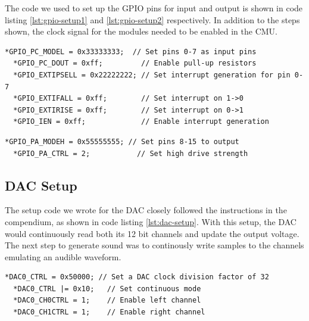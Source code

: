 The code we used to set up the GPIO pins for input and output is shown in code listing \ref{lst:gpio-setup1} and \ref{lst:gpio-setup2} respectively. In addition to the steps shown, the clock signal for the modules needed to be enabled in the CMU. \\

\noindent\begin{minipage}[pos=c,contentpos=c]{\textwidth}
  \begin{lstlisting}[caption=Setting GPIO pins 0-7 as input,label={lst:gpio-setup1}]
  *GPIO_PC_MODEL = 0x33333333;  // Set pins 0-7 as input pins
  *GPIO_PC_DOUT = 0xff;         // Enable pull-up resistors
  *GPIO_EXTIPSELL = 0x22222222; // Set interrupt generation for pin 0-7
  *GPIO_EXTIFALL = 0xff;        // Set interrupt on 1->0
  *GPIO_EXTIRISE = 0xff;        // Set interrupt on 0->1
  *GPIO_IEN = 0xff;             // Enable interrupt generation
  \end{lstlisting}
\end{minipage}

\noindent\begin{minipage}[c]{\textwidth}
  \begin{lstlisting}[caption=Setting GPIO pins 8-15 as output,label={lst:gpio-setup2}]
  *GPIO_PA_MODEH = 0x55555555; // Set pins 8-15 to output
  *GPIO_PA_CTRL = 2;           // Set high drive strength
  \end{lstlisting}
\end{minipage}


\subsection{DAC Setup}
The setup code we wrote for the DAC closely followed the instructions in the compendium, as shown in code listing \ref{lst:dac-setup}. With this setup, the DAC would continuously read both its 12 bit channels and update the output voltage. The next step to generate sound was to continously write samples to the channels emulating an audible waveform.\\

\noindent\begin{minipage}[c]{\textwidth}
  \begin{lstlisting}[caption=Setting up the DAC,label={lst:dac-setup}]
  *DAC0_CTRL = 0x50000; // Set a DAC clock division factor of 32
  *DAC0_CTRL |= 0x10;   // Set continuous mode
  *DAC0_CH0CTRL = 1;    // Enable left channel
  *DAC0_CH1CTRL = 1;    // Enable right channel
  \end{lstlisting}
\end{minipage}

